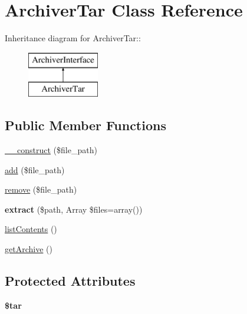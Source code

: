 \hypertarget{classArchiverTar}{
\section{ArchiverTar Class Reference}
\label{classArchiverTar}
}
Inheritance diagram for ArchiverTar::\begin{figure}[H]
\begin{center}
\leavevmode
\includegraphics[height=2cm]{classArchiverTar}
\end{center}
\end{figure}
\subsection*{Public Member Functions}
\begin{DoxyCompactItemize}
\item 
\hyperlink{classArchiverTar_af3727d4c5fa466d4aabde81bb9d4c7df}{\_\-\_\-construct} (\$file\_\-path)
\item 
\hyperlink{classArchiverTar_a23c343bebf4ba3a61fc8087427406bbe}{add} (\$file\_\-path)
\item 
\hyperlink{classArchiverTar_a7e3e6cc10110d77b1411074f7e65c2e0}{remove} (\$file\_\-path)
\item 
\hypertarget{classArchiverTar_a56055f3c010d727ecc260f49e514649f}{
{\bfseries extract} (\$path, Array \$files=array())}
\label{classArchiverTar_a56055f3c010d727ecc260f49e514649f}

\item 
\hyperlink{classArchiverTar_a6293cb8fd0519ae617a789ea08799914}{listContents} ()
\item 
\hyperlink{classArchiverTar_a2898ddb1ed703ef248a7358be9237c86}{getArchive} ()
\end{DoxyCompactItemize}
\subsection*{Protected Attributes}
\begin{DoxyCompactItemize}
\item 
\hypertarget{classArchiverTar_aceaa126d4723ef39d100d2befadccdfb}{
{\bfseries \$tar}}
\label{classArchiverTar_aceaa126d4723ef39d100d2befadccdfb}

\end{DoxyCompactItemize}


